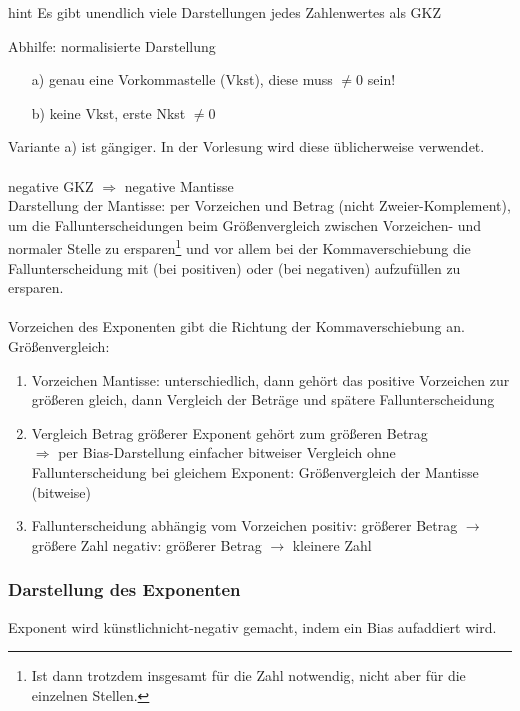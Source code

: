 \documentclass[10pt,a4paper]{scrartcl}
\begin{document}
\begin{Hint}{}{hint}
	Es gibt unendlich viele Darstellungen jedes Zahlenwertes als \ac{GKZ}
\end{Hint}

Abhilfe: normalisierte Darstellung
\begin{itemize}
	\item[a)]  genau eine Vorkommastelle (Vkst), diese muss $ \neq 0 $ sein!
	\item[b)] keine Vkst, erste Nkst $ \neq 0 $
\end{itemize}

Variante a) ist gängiger. In der Vorlesung wird diese üblicherweise verwendet.\\
\\
\textcolor{blue!60}{negative \ac{GKZ} $ \Rightarrow $ negative Mantisse} \\

Darstellung der Mantisse: per Vorzeichen und Betrag (nicht Zweier-Komplement), um die Fallunterscheidungen beim Größenvergleich zwischen Vorzeichen- und normaler Stelle zu ersparen\footnote{Ist dann trotzdem insgesamt für die Zahl notwendig, nicht aber für die einzelnen Stellen.} und vor allem bei der Kommaverschiebung die Fallunterscheidung mit \grqq (bei positiven) oder \grqq (bei negativen) aufzufüllen zu ersparen.\\
\\
Vorzeichen des Exponenten gibt die Richtung der Kommaverschiebung an.\\
Größenvergleich:\\
\begin{enumerate}
	\item Vorzeichen Mantisse: 
		\subitem unterschiedlich, dann gehört das positive Vorzeichen zur größeren
		\subitem gleich, dann Vergleich der Beträge und spätere Fallunterscheidung
	\item Vergleich Betrag
		\subitem größerer Exponent gehört zum größeren Betrag \\
			$ \Rightarrow $ per Bias-Darstellung einfacher bitweiser Vergleich ohne Fallunterscheidung
		\subitem bei gleichem Exponent: Größenvergleich der Mantisse (bitweise)
	\item Fallunterscheidung abhängig vom Vorzeichen
		\subitem positiv: größerer Betrag $ \rightarrow $ größere Zahl
		\subitem negativ: größerer Betrag $ \rightarrow $ kleinere Zahl
\end{enumerate}

\subsubsection*{Darstellung des Exponenten}
Exponent wird \glqq künstlich\grqq nicht-negativ gemacht, indem ein Bias aufaddiert wird.
\end{document}
